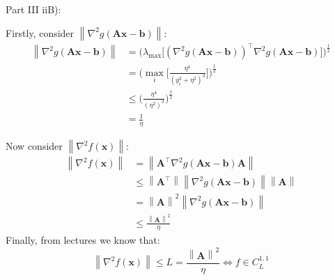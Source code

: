 \documentclass{article}
\newcommand{\norm}[1]{\left \lVert #1 \right \rVert}
\begin{document}
Part III iiB):

Firstly, consider $\norm{\nabla^2g(\mathbf{Ax-b})}$:
\begin{equation}\begin{split}
\norm{\nabla^2g(\mathbf{Ax-b})} & = \biggl( \lambda_{\text{max}}\bigg[(\nabla^2g(\mathbf{Ax-b}))^\intercal \nabla^2g(\mathbf{Ax-b})\bigg] \biggl)^\frac{1}{2} \\
& = \biggl( \max_{i}\bigg[ \frac{\eta^4}{(y_i^2+\eta^2)^3} \bigg] \biggl)^\frac{1}{2} \\
& \leq \bigg( \frac{\eta^4}{(\eta^2)^3} \bigg)^\frac{1}{2} \\
& = \frac{1}{\eta}
\end{split}\end{equation}

Now consider $\norm{\nabla^2f(\mathbf{x})}$:
\begin{equation}\begin{split}
\norm{\nabla^2f(\mathbf{x})} & = \norm{\mathbf{A}^\intercal \nabla^2g(\mathbf{Ax-b}) \mathbf{A}} \\
& \leq \norm{\mathbf{A^\intercal}} \norm{\nabla^2g(\mathbf{Ax-b})} \norm{\mathbf{A}} \\
& = \norm{\mathbf{A}}^2 \norm{\nabla^2g(\mathbf{Ax-b})} \\
& \leq \frac{\norm{\mathbf{A}}^2}{\eta}
\end{split}\end{equation}
Finally, from lectures we know that: 
$$
\norm{\nabla^2f(\mathbf{x})} \leq L = \frac{\norm{\mathbf{A}}^2}{\eta} \iff f \in C_L^{1,1}
$$
\end{document}

